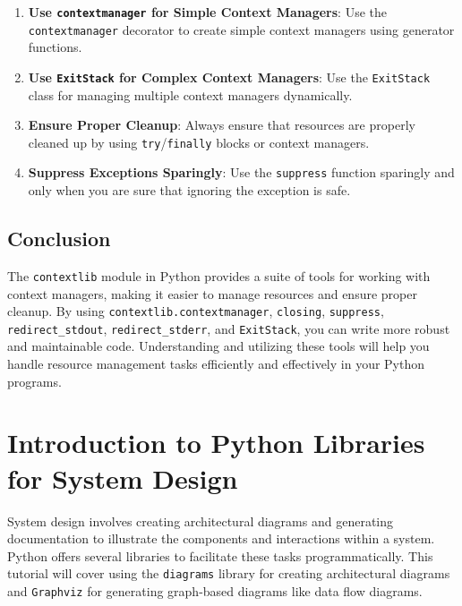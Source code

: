 \documentclass[
  letterpaper,
  DIV=11,
  numbers=noendperiod]{scrreprt}
\providecommand{\tightlist}{%
  \setlength{\itemsep}{0pt}\setlength{\parskip}{0pt}}\usepackage{longtable,booktabs,array}
\begin{document}
\begin{enumerate}
\def\labelenumi{\arabic{enumi}.}
\tightlist
\item
  \textbf{Use \texttt{contextmanager} for Simple Context Managers}: Use
  the \texttt{contextmanager} decorator to create simple context
  managers using generator functions.
\item
  \textbf{Use \texttt{ExitStack} for Complex Context Managers}: Use the
  \texttt{ExitStack} class for managing multiple context managers
  dynamically.
\item
  \textbf{Ensure Proper Cleanup}: Always ensure that resources are
  properly cleaned up by using \texttt{try}/\texttt{finally} blocks or
  context managers.
\item
  \textbf{Suppress Exceptions Sparingly}: Use the \texttt{suppress}
  function sparingly and only when you are sure that ignoring the
  exception is safe.
\end{enumerate}

\section{Conclusion}\label{conclusion-37}

The \texttt{contextlib} module in Python provides a suite of tools for
working with context managers, making it easier to manage resources and
ensure proper cleanup. By using \texttt{contextlib.contextmanager},
\texttt{closing}, \texttt{suppress}, \texttt{redirect\_stdout},
\texttt{redirect\_stderr}, and \texttt{ExitStack}, you can write more
robust and maintainable code. Understanding and utilizing these tools
will help you handle resource management tasks efficiently and
effectively in your Python programs.


\chapter{Introduction to Python Libraries for System
Design}\label{introduction-to-python-libraries-for-system-design}

System design involves creating architectural diagrams and generating
documentation to illustrate the components and interactions within a
system. Python offers several libraries to facilitate these tasks
programmatically. This tutorial will cover using the \texttt{diagrams}
library for creating architectural diagrams and \texttt{Graphviz} for
generating graph-based diagrams like data flow diagrams.
\end{document}
